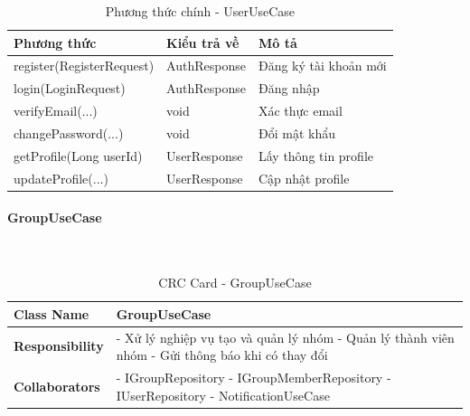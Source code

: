 \begin{table}[H]
\small
\renewcommand{\arraystretch}{1.3}
\begin{tabularx}{\textwidth}{|>{\raggedright\arraybackslash}p{5cm}|>{\raggedright\arraybackslash}p{3cm}|X|}
\hline
\rowcolor{gray!20}
\textbf{Phương thức} & \textbf{Kiểu trả về} & \textbf{Mô tả} \\
\hline
register(RegisterRequest) & AuthResponse & Đăng ký tài khoản mới \\
\hline
login(LoginRequest) & AuthResponse & Đăng nhập \\
\hline
verifyEmail(...) & void & Xác thực email \\
\hline
changePassword(...) & void & Đổi mật khẩu \\
\hline
getProfile(Long userId) & UserResponse & Lấy thông tin profile \\
\hline
updateProfile(...) & UserResponse & Cập nhật profile \\
\hline
\end{tabularx}
\caption{Phương thức chính - UserUseCase}
\end{table}

\paragraph{GroupUseCase} ~\\

\begin{table}[H]
\small
\renewcommand{\arraystretch}{1.3}
\begin{tabularx}{\textwidth}{|>{\raggedright\arraybackslash}p{3.5cm}|X|}
\hline
\rowcolor{gray!20}
\textbf{Class Name} & GroupUseCase \\
\hline
\textbf{Responsibility} & - Xử lý nghiệp vụ tạo và quản lý nhóm \newline - Quản lý thành viên nhóm \newline - Gửi thông báo khi có thay đổi \\
\hline
\textbf{Collaborators} & - IGroupRepository \newline - IGroupMemberRepository \newline - IUserRepository \newline - NotificationUseCase \\
\hline
\end{tabularx}
\caption{CRC Card - GroupUseCase}
\end{table}

